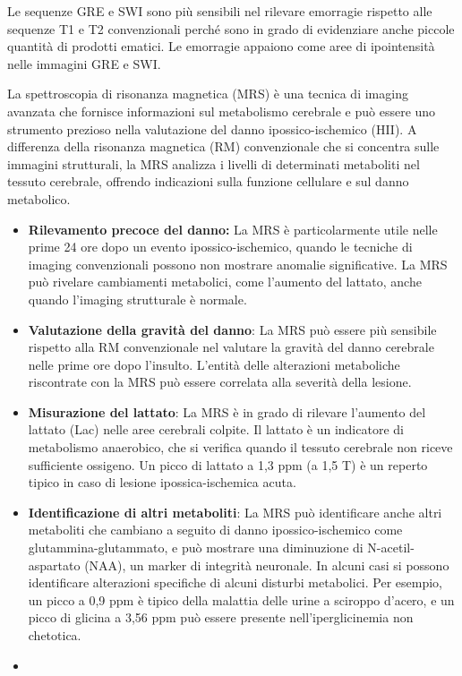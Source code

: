 Le sequenze GRE e SWI sono più sensibili nel rilevare emorragie rispetto alle sequenze T1 e T2 convenzionali perché sono in grado di evidenziare anche piccole quantità di prodotti ematici. Le emorragie appaiono come aree di ipointensità nelle immagini GRE e SWI.

La spettroscopia di risonanza magnetica (MRS) è una tecnica di imaging avanzata che fornisce informazioni sul metabolismo cerebrale e può essere uno strumento prezioso nella valutazione del danno ipossico-ischemico (HII). A differenza della risonanza magnetica (RM) convenzionale che si concentra sulle immagini strutturali, la MRS analizza i livelli di determinati metaboliti nel tessuto cerebrale, offrendo indicazioni sulla funzione cellulare e sul danno metabolico.

\begin{itemize}
	\tightlist
	\item
	\textbf{Rilevamento precoce del danno:} La MRS è particolarmente utile nelle prime 24 ore dopo un evento ipossico-ischemico, quando le tecniche di imaging convenzionali possono non mostrare anomalie significative. La MRS può rivelare cambiamenti metabolici, come l'aumento del lattato, anche quando l'imaging strutturale è normale.
	\item
	\textbf{Valutazione della gravità del danno}: La MRS può essere più sensibile rispetto alla RM convenzionale nel valutare la gravità del danno cerebrale nelle prime ore dopo l'insulto. L'entità delle alterazioni metaboliche riscontrate con la MRS può essere correlata alla severità della lesione.
	\item
	\textbf{Misurazione del lattato}: La MRS è in grado di rilevare l'aumento del lattato (Lac) nelle aree cerebrali colpite. Il lattato è un indicatore di metabolismo anaerobico, che si verifica quando il tessuto cerebrale non riceve sufficiente ossigeno. Un picco di lattato a 1,3 ppm (a 1,5 T) è un reperto tipico in caso di lesione ipossica-ischemica acuta.
	\item
	\textbf{Identificazione di altri metaboliti}: La MRS può identificare anche altri metaboliti che cambiano a seguito di danno ipossico-ischemico come glutammina-glutammato, e può mostrare una diminuzione di N-acetil-aspartato (NAA), un marker di integrità neuronale. In alcuni casi si possono identificare alterazioni specifiche di alcuni disturbi metabolici. Per esempio, un picco a 0,9 ppm è tipico della malattia delle urine a sciroppo d'acero, e un picco di glicina a 3,56 ppm può essere presente nell'iperglicinemia non chetotica.
	\item

\end{itemize}
